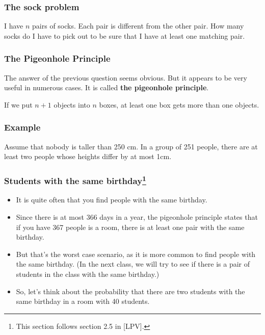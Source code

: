 

\begin{frame}\frametitle{The sock problem}
  \begin{tcolorbox}
    I have $n$ pairs of socks.  Each pair is different from the other
    pair.  How many socks do I have to pick out to be sure that I have
    at least one matching pair.
  \end{tcolorbox}
  \vspace{2in}
\end{frame}

\begin{frame}\frametitle{The Pigeonhole Principle}
  The answer of the previous question seems obvious.  But it appears
  to be very useful in numerous cases.  It is called {\bf the
    pigeonhole principle}.

  \begin{tcolorbox}[title=The pigeonhole principle]
    If we put $n+1$ objects into $n$ boxes, at least one box gets more
    than one objects.
  \end{tcolorbox}
\end{frame}

\begin{frame}\frametitle{Example}
  \begin{tcolorbox}
    Assume that nobody is taller than 250 cm.  In a group of 251
    people, there are at least two people whose heights differ by at
    most 1cm.
  \end{tcolorbox}
  \vspace{2in}
\end{frame}

\begin{frame}\frametitle{Students with the same birthday\footnote{This section follows section 2.5 in [LPV].}}
  \begin{itemize}
  \item It is quite often that you find people with the same birthday.
  \item Since there is at most 366 days in a year, the pigeonhole
    principle states that if you have 367 people is a room, there is
    at least one pair with the same birthday.
    \pause
  \item But that's the worst case scenario, as it is more common to
    find people with the same birthday.  (In the next class, we will
    try to see if there is a pair of students in the class with the
    same birthday.)
    \pause
  \item So, let's think about the probability that there are two
    students with the same birthday in a room with 40 students.
  \end{itemize}
\end{frame}

